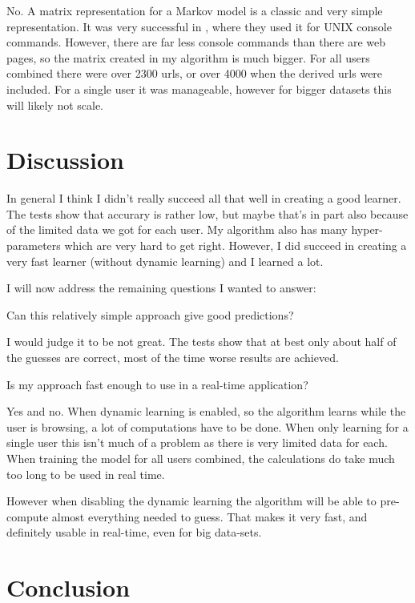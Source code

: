 \documentclass{article}
\begin{document}
No.
A matrix representation for a Markov model is a classic and very simple representation.
It was very successful in \cite{davison1998predicting}, where they used it for UNIX console commands.
However, there are far less console commands than there are web pages, so the matrix created in my algorithm is much bigger.
For all users combined there were over 2300 urls, or over 4000 when the derived urls were included.
For a single user it was manageable, however for bigger datasets this will likely not scale.

\section{Discussion}

In general I think I didn't really succeed all that well in creating a good learner.
The tests show that accurary is rather low, but maybe that's in part also because of the limited data we got for each user.
My algorithm also has many hyper-parameters which are very hard to get right.
However, I did succeed in creating a very fast learner (without dynamic learning) and I learned a lot.

I will now address the remaining questions I wanted to answer:

\begin{displayquote}
Can this relatively simple approach give good predictions?
\end{displayquote}

I would judge it to be not great.
The tests show that at best only about half of the guesses are correct, most of the time worse results are achieved.

\begin{displayquote}
Is my approach fast enough to use in a real-time application?
\end{displayquote}

Yes and no.
When dynamic learning is enabled, so the algorithm learns while the user is browsing, a lot of computations have to be done.
When only learning for a single user this isn't much of a problem as there is very limited data for each.
When training the model for all users combined, the calculations do take much too long to be used in real time.

However when disabling the dynamic learning the algorithm will be able to pre-compute almost everything needed to guess.
That makes it very fast, and definitely usable in real-time, even for big data-sets.

\section{Conclusion}
\end{document}
